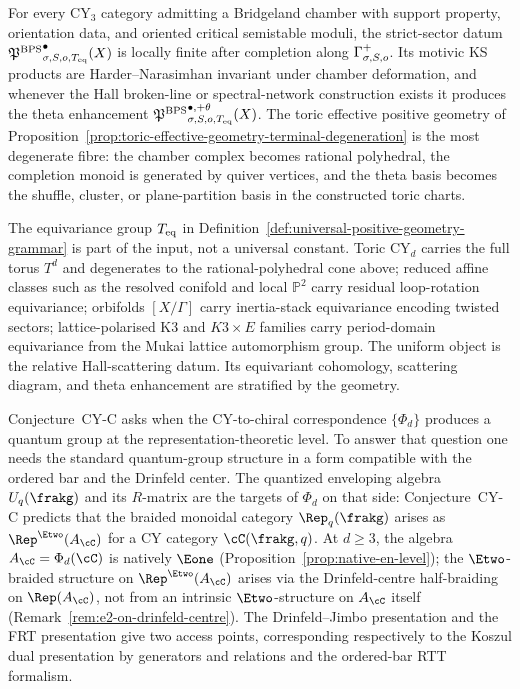 \begin{conjecture}
\label{conj:effective-bps-cone-positive-basis}
For every CY$_3$ category admitting a Bridgeland chamber with support
property, orientation data, and oriented critical semistable moduli, the
strict-sector datum ${\mathfrak{P}^{\mathrm{BPS}}}^{\bullet}_{\sigma,S,o,T_{\mathrm{eq}}}(X)$ is locally
finite after completion along $\Gamma^{+}_{\sigma,S,o}$. Its motivic KS products are
Harder--Narasimhan invariant under chamber deformation, and whenever the
Hall broken-line or spectral-network construction exists it produces the
theta enhancement
${\mathfrak{P}^{\mathrm{BPS}}}^{\bullet,+\theta}_{\sigma,S,o,T_{\mathrm{eq}}}(X)$. The toric effective
positive geometry of
Proposition~\ref{prop:toric-effective-geometry-terminal-degeneration}
is the most degenerate fibre: the chamber complex becomes rational
polyhedral, the completion monoid is generated by quiver vertices, and
the theta basis becomes the shuffle, cluster, or plane-partition basis in
the constructed toric charts.
\end{conjecture}

\begin{remark}
\label{rem:equivariance-stratifies-by-class}
The equivariance group $T_{\mathrm{eq}}$ in
Definition~\ref{def:universal-positive-geometry-grammar} is part of the
input, not a universal constant. Toric CY$_d$ carries the full torus
$T^d$ and degenerates to the rational-polyhedral cone above; reduced
affine classes such as the resolved conifold and local $\mathbb{P}^2$
carry residual loop-rotation equivariance; orbifolds $[X/\Gamma]$ carry
inertia-stack equivariance encoding twisted sectors; lattice-polarised
K3 and $K3\times E$ families carry period-domain equivariance from the
Mukai lattice automorphism group. The uniform object is the relative
Hall-scattering datum. Its equivariant cohomology, scattering diagram,
and theta enhancement are stratified by the geometry.
\end{remark}

Conjecture~CY-C asks when the CY-to-chiral correspondence $\{\Phi_d\}$ produces a quantum group at the representation-theoretic level. To answer that question one needs the standard quantum-group structure in a form compatible with the ordered bar and the Drinfeld center. The quantized enveloping algebra $U_q(\frakg)$ and its $R$-matrix are the targets of $\Phi_d$ on that side: Conjecture~CY-C predicts that the braided monoidal category $\Rep_q(\frakg)$ arises as $\Rep^{\Etwo}(A_\cC)$ for a CY category $\cC(\frakg, q)$. At $d \geq 3$, the algebra $A_\cC = \Phi_d(\cC)$ is natively $\Eone$ (Proposition~\ref{prop:native-en-level}); the $\Etwo$-braided structure on $\Rep^{\Etwo}(A_\cC)$ arises via the Drinfeld-centre half-braiding on $\Rep(A_\cC)$, not from an intrinsic $\Etwo$-structure on $A_\cC$ itself (Remark~\ref{rem:e2-on-drinfeld-centre}). The Drinfeld--Jimbo presentation and the FRT presentation give two access points, corresponding respectively to the Koszul dual presentation by generators and relations and the ordered-bar RTT formalism.

